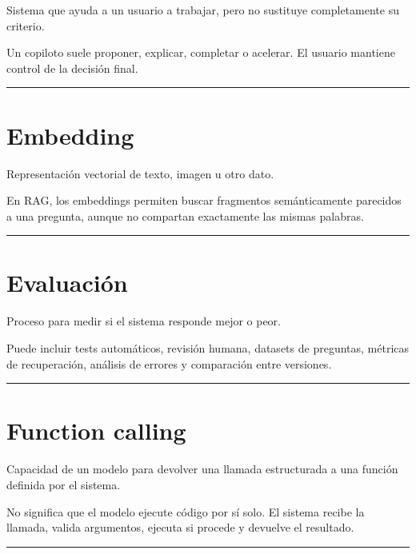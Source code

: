 Sistema que ayuda a un usuario a trabajar, pero no sustituye
completamente su criterio.

Un copiloto suele proponer, explicar, completar o acelerar. El usuario
mantiene control de la decisión final.

\begin{center}\rule{0.5\linewidth}{0.5pt}\end{center}

\section{Embedding}\label{embedding}

Representación vectorial de texto, imagen u otro dato.

En RAG, los embeddings permiten buscar fragmentos semánticamente
parecidos a una pregunta, aunque no compartan exactamente las mismas
palabras.

\begin{center}\rule{0.5\linewidth}{0.5pt}\end{center}

\section{Evaluación}\label{evaluaciuxf3n-3}

Proceso para medir si el sistema responde mejor o peor.

Puede incluir tests automáticos, revisión humana, datasets de preguntas,
métricas de recuperación, análisis de errores y comparación entre
versiones.

\begin{center}\rule{0.5\linewidth}{0.5pt}\end{center}

\section{Function calling}\label{function-calling}

Capacidad de un modelo para devolver una llamada estructurada a una
función definida por el sistema.

No significa que el modelo ejecute código por sí solo. El sistema recibe
la llamada, valida argumentos, ejecuta si procede y devuelve el
resultado.

\begin{center}\rule{0.5\linewidth}{0.5pt}\end{center}

